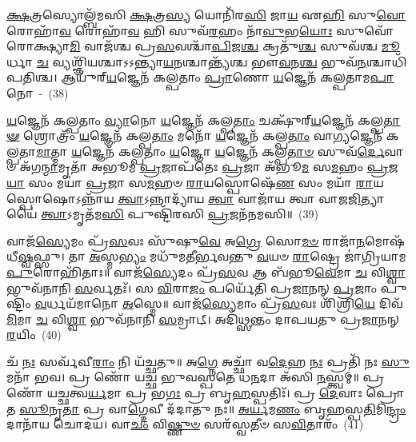 {\anuvakamend[{\-\ul{𑌸𑍍𑌕}\-\-\ul{𑌭𑍍𑌨𑍀}\-\-\ul{𑌤} \ul{𑌯𑍁}\-\-\ul{𑌯}\-\-\ul{𑌵}\-\-\ul{𑌨𑍍𑌪𑌿}\-𑌤\-\ul{𑌰𑌾} 𑌦𑍍𑌵𑌿𑌚᳴𑌤𑍍𑌵𑌾𑌰𑌿𑍞𑌶𑌚𑍍𑌚}]}%

\-\ul{𑌕𑍍𑌷}\-𑌤𑍍𑌰𑌸𑍍𑌯𑍋𑌲𑍍𑌬᳴𑌮𑌸𑌿 \ul{𑌕𑍍𑌷}\-𑌤𑍍𑌰\-\ul{𑌸𑍍𑌯} 𑌯𑍋𑌨𑌿᳴𑌰\-\ul{𑌸𑌿} 𑌜𑌾\-\ul{𑌯} 𑌏\-\ul{𑌹𑌿} 𑌸𑍁\-\ul{𑌵𑍋} 𑌰𑍋𑌹𑌾᳴\-\ul{𑌵} 𑌰𑍋𑌹𑌾᳴\-\ul{𑌵} 𑌹𑌿 𑌸𑍁𑌵᳴\-\ul{𑌰}\-𑌹𑌂 𑌨𑌾᳴\-\ul{𑌵𑍁}\-𑌭\-\ul{𑌯𑍋𑌃} 𑌸𑍁𑌵𑍋᳴ 𑌰𑍋𑌕𑍍𑌷𑍍𑌯𑌾\-\ul{𑌮𑌿} 𑌵𑌾𑌜᳴𑌶𑍍𑌚 𑌪𑍍𑌰\-\ul{𑌸}\-𑌵𑌶𑍍𑌚𑌾᳴\-\ul{𑌪𑌿}\-𑌜\-\ul{𑌶𑍍𑌚} 𑌕𑍍𑌰𑌤𑍁᳴\-\ul{𑌶𑍍𑌚} 𑌸𑍁𑌵᳴𑌶𑍍𑌚 \ul{𑌮𑍂}\-𑌰𑍍𑌧𑌾 \ul{𑌚} 𑌵𑍍𑌯𑌶𑍍𑌞𑌿᳴𑌯𑌶𑍍𑌚𑌾\-𑌽\-𑌽𑌨𑍍𑌤𑍍𑌯𑌾\-\ul{𑌯}\-𑌨𑌶𑍍𑌚𑌾𑌨𑍍𑌤𑍍𑌯᳴𑌶𑍍𑌚 𑌭𑍗\-\ul{𑌵}\-𑌨\-\ul{𑌶𑍍𑌚} 𑌭𑍁𑌵᳴\-\ul{𑌨}\-𑌶𑍍𑌚𑌾𑌧𑌿᳴𑌪𑌤𑌿𑌶𑍍𑌚। 𑌆𑌯𑍁᳴𑌰𑍍‌\-\ul{𑌯}\-𑌜𑍍𑌞𑍇𑌨᳴ 𑌕𑌲𑍍𑌪𑌤𑌾𑌂 \ul{𑌪𑍍𑌰𑌾}\-𑌣𑍋 \ul{𑌯}\-𑌜𑍍𑌞𑍇𑌨᳴ 𑌕𑌲𑍍𑌪𑌤𑌾𑌮\-\ul{𑌪𑌾}\-𑌨𑍋~-~(38)

\-\ul{𑌯}\-𑌜𑍍𑌞𑍇𑌨᳴ 𑌕𑌲𑍍𑌪𑌤𑌾𑌂 \ul{𑌵𑍍𑌯𑌾}\-𑌨𑍋 \ul{𑌯}\-𑌜𑍍𑌞𑍇𑌨᳴ 𑌕𑌲𑍍𑌪\-\ul{𑌤𑌾𑌂} 𑌚𑌕𑍍𑌷𑍁᳴𑌰𑍍‌\-\ul{𑌯}\-𑌜𑍍𑌞𑍇𑌨᳴ 𑌕𑌲𑍍𑌪\-\ul{𑌤𑌾}\-\-\ul{𑍟} 𑌶𑍍𑌰𑍋𑌤𑍍𑌰𑌂᳴ \ul{𑌯}\-𑌜𑍍𑌞𑍇𑌨᳴ 𑌕𑌲𑍍𑌪\-\ul{𑌤𑌾𑌂} 𑌮𑌨𑍋᳴ \ul{𑌯}\-𑌜𑍍𑌞𑍇𑌨᳴ 𑌕𑌲𑍍𑌪\-\ul{𑌤𑌾𑌂} 𑌵𑌾\-\ul{𑌗𑍍𑌯}\-𑌜𑍍𑌞𑍇𑌨᳴ 𑌕𑌲𑍍𑌪𑌤𑌾\-\ul{𑌮𑌾}\-𑌤𑍍𑌮𑌾 \ul{𑌯}\-𑌜𑍍𑌞𑍇𑌨᳴ 𑌕𑌲𑍍𑌪𑌤𑌾𑌂 \ul{𑌯}\-𑌜𑍍𑌞𑍋 \ul{𑌯}\-𑌜𑍍𑌞𑍇𑌨᳴ 𑌕𑌲𑍍𑌪\-\ul{𑌤𑌾}\-\-\ul{𑍞} 𑌸𑍁𑌵᳴\-\ul{𑌰𑍍𑌦𑍇}\-𑌵𑌾𑍞 𑌅᳴𑌗\-\ul{𑌨𑍍𑌮𑌾}\-𑌮𑍃𑌤𑌾᳴ 𑌅𑌭𑍂𑌮 \ul{𑌪𑍍𑌰}\-𑌜𑌾𑌪᳴𑌤𑍇𑌃 \ul{𑌪𑍍𑌰}\-𑌜𑌾 𑌅᳴𑌭𑍂\-\ul{𑌮} 𑌸\-\ul{𑌮}\-𑌹𑌂 \ul{𑌪𑍍𑌰}\-𑌜\-\ul{𑌯𑌾} 𑌸𑌂 𑌮𑌯𑌾॑ \ul{𑌪𑍍𑌰}\-𑌜𑌾 𑌸\-\ul{𑌮}\-𑌹𑍞 \ul{𑌰𑌾}\-𑌯𑌸𑍍𑌪𑍋𑌷𑍇᳴\-\ul{𑌣} 𑌸𑌂 𑌮𑌯𑌾᳴ \ul{𑌰𑌾}\-𑌯𑌸𑍍𑌪𑍋𑌷𑍋\-𑌽𑌨𑍍𑌨𑌾᳴𑌯 \ul{𑌤𑍍𑌵𑌾}\-\-𑌽𑌨𑍍𑌨𑌾𑌦𑍍𑌯𑌾᳴𑌯 \ul{𑌤𑍍𑌵𑌾} 𑌵𑌾𑌜𑌾᳴𑌯 𑌤𑍍𑌵𑌾 𑌵𑌾𑌜\-\ul{𑌜𑌿}\-𑌤𑍍𑌯𑌾𑌯𑍈॑ \ul{𑌤𑍍𑌵𑌾}\-\-𑌽𑌮𑍃𑌤᳴𑌮\-\ul{𑌸𑌿} 𑌪𑍁𑌷𑍍𑌟𑌿᳴𑌰𑌸𑌿 \ul{𑌪𑍍𑌰}\-𑌜𑌨᳴𑌨𑌮𑌸𑌿॥~(39)

{\anuvakamend[{\-\ul{𑌅}\-\-\ul{𑌪𑌾}\-𑌨𑍋 𑌵𑌾𑌜𑌾᳴\-\ul{𑌯} 𑌨𑌵᳴ 𑌚}]}%

𑌵𑌾𑌜᳴\-\ul{𑌸𑍍𑌯𑍇}\-𑌮𑌂 𑌪𑍍𑌰᳴\-\ul{𑌸}\-𑌵𑌃 𑌸𑍁᳴𑌷𑍁\-\ul{𑌵𑍇} 𑌅\-\ul{𑌗𑍍𑌰𑍇} 𑌸𑍋\-\ul{𑌮}\-\-\ul{𑍞} 𑌰𑌾𑌜𑌾᳴\-\ul{𑌨}\-𑌮𑍋𑌷᳴𑌧𑍀\-\ul{𑌷𑍍𑌵}\-𑌫𑍍𑌸𑍁। 𑌤𑌾 \ul{𑌅}\-𑌸𑍍𑌮\-\ul{𑌭𑍍𑌯𑌂} 𑌮𑌧𑍁᳴𑌮𑌤𑍀𑌰𑍍𑌭𑌵𑌨𑍍𑌤𑍁 \ul{𑌵}\-𑌯𑍞 \ul{𑌰𑌾}\-𑌷𑍍𑌟𑍍𑌰𑍇 𑌜𑌾॑𑌗𑍍𑌰𑌿𑌯𑌾𑌮 \ul{𑌪𑍁}\-𑌰𑍋𑌹𑌿᳴𑌤𑌾𑌃॥ 𑌵𑌾𑌜᳴\-\ul{𑌸𑍍𑌯𑍇}\-𑌦𑌂 𑌪𑍍𑌰᳴\-\ul{𑌸}\-𑌵 𑌆 𑌬᳴𑌭𑍂\-\ul{𑌵𑍇}\-𑌮𑌾 \ul{𑌚} 𑌵𑌿\-\ul{𑌶𑍍𑌵𑌾} 𑌭𑍁𑌵᳴𑌨𑌾𑌨𑌿 \ul{𑌸}\-𑌰𑍍𑌵𑌤𑌃᳴। 𑌸 \ul{𑌵𑌿}\-𑌰𑌾\-\ul{𑌜𑌂} 𑌪𑌰𑍍𑌯𑍇᳴𑌤𑌿 𑌪𑍍𑌰\-\ul{𑌜𑌾}\-𑌨𑌨𑍍 \ul{𑌪𑍍𑌰}\-𑌜𑌾𑌂 𑌪𑍁𑌷𑍍𑌟𑌿𑌂᳴ \ul{𑌵}\-𑌰𑍍𑌧𑌯᳴𑌮𑌾𑌨𑍋 \ul{𑌅}\-𑌸𑍍𑌮𑍇॥ 𑌵𑌾𑌜᳴\-\ul{𑌸𑍍𑌯𑍇}\-𑌮𑌾𑌂 𑌪𑍍𑌰᳴\-\ul{𑌸}\-𑌵𑌃 𑌶𑌿᳴𑌶𑍍𑌰𑌿\-\ul{𑌯𑍇} 𑌦𑌿𑌵᳴\-\ul{𑌮𑌿}\-𑌮𑌾 \ul{𑌚} 𑌵𑌿\-\ul{𑌶𑍍𑌵𑌾} 𑌭𑍁𑌵᳴𑌨𑌾𑌨𑌿 \ul{𑌸}\-𑌮𑍍𑌰𑌾𑌟𑍍। 𑌅𑌦𑌿᳴𑌥𑍍𑌸𑌨𑍍𑌤𑌂 𑌦𑌾𑌪𑌯𑌤𑍁 𑌪𑍍𑌰\-\ul{𑌜𑌾}\-𑌨𑌨𑍍 \ul{𑌰}\-𑌯𑌿𑌂~(40)

𑌚᳴ \ul{𑌨𑌃} 𑌸𑌰𑍍𑌵᳴𑌵𑍀\-\ul{𑌰𑌾𑌂} 𑌨𑌿 𑌯᳴𑌚𑍍𑌛𑌤𑍁॥ 𑌅\-\ul{𑌗𑍍𑌨𑍇} 𑌅𑌚𑍍𑌛𑌾᳴ 𑌵\-\ul{𑌦𑍇}\-𑌹 \ul{𑌨𑌃} 𑌪𑍍𑌰𑌤𑌿᳴ 𑌨𑌃 \ul{𑌸𑍁}\-𑌮𑌨𑌾᳴ 𑌭𑌵। 𑌪𑍍𑌰 𑌣𑍋᳴ 𑌯𑌚𑍍𑌛 𑌭𑍁𑌵𑌸𑍍𑌪𑌤𑍇 𑌧\-\ul{𑌨}\-𑌦𑌾 𑌅᳴𑌸𑌿 \ul{𑌨}\-𑌸𑍍𑌤𑍍𑌵𑌮𑍍॥ 𑌪𑍍𑌰 𑌣𑍋᳴ 𑌯𑌚𑍍𑌛𑌤𑍍𑌵\-\ul{𑌰𑍍𑌯}\-𑌮𑌾 𑌪𑍍𑌰 𑌭\-\ul{𑌗𑌃} 𑌪𑍍𑌰 𑌬𑍃\-\ul{𑌹}\-𑌸𑍍𑌪𑌤𑌿𑌃᳴। 𑌪𑍍𑌰 \ul{𑌦𑍇}\-𑌵𑌾𑌃 𑌪𑍍𑌰𑍋𑌤 \ul{𑌸𑍂}\-𑌨𑍃\-\ul{𑌤𑌾} 𑌪𑍍𑌰 𑌵𑌾\-\ul{𑌗𑍍𑌦𑍇}\-𑌵𑍀 𑌦᳴𑌦𑌾𑌤𑍁 𑌨𑌃॥ \ul{𑌅}\-\-\ul{𑌰𑍍𑌯}\-𑌮\-\ul{𑌣𑌂} 𑌬𑍃\-\ul{𑌹}\-𑌸𑍍𑌪\-\ul{𑌤𑌿}\-𑌮𑌿\-\ul{𑌨𑍍𑌦𑍍𑌰𑌂} 𑌦𑌾𑌨𑌾᳴𑌯 𑌚𑍋𑌦𑌯। 𑌵𑌾\-\ul{𑌚𑌂} 𑌵𑌿\-\ul{𑌷𑍍𑌣𑍁}\-\-\ul{𑍞} 𑌸𑌰᳴𑌸𑍍𑌵𑌤𑍀𑍞 𑌸\-\ul{𑌵𑌿}\-𑌤𑌾𑌰𑌂᳴~(41)

